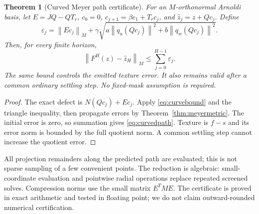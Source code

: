 \documentclass[journal]{IEEEtran}
\newtheorem{theorem}{Theorem}
\theoremstyle{definition}
\newcommand{\norm}[1]{\left\lVert#1\right\rVert}
\begin{document}
\begin{theorem}[Curved Meyer path certificate]\label{thm:curvedpath}
For an $M$-orthonormal Arnoldi basis, let $E=JQ-QT_r$,
$c_0=0$, $c_{j+1}=\beta e_1+T_r c_j$, and
$\widehat z_j=z+Qc_j$. Define
\[
 \varepsilon_j=\norm{Ec_j}_M+
 \gamma\sqrt{a\norm{q_u(Qc_j)}^2+b\norm{q_w(Qc_j)}^2}.
\]
Then, for every finite horizon,
\begin{equation}
 \norm{F^H(z)-\widehat z_H}_M
 \leq\sum_{j=0}^{H-1}\varepsilon_j. \label{eq:curvedpath}
\end{equation}
The same bound controls the emitted texture error. It also remains valid
after a common ordinary settling step. No fixed-mask assumption is required.
\end{theorem}
\begin{proof}
The exact defect is $N(Qc_j)+Ec_j$. Apply \eqref{eq:curvebound} and the
triangle inequality, then propagate errors by Theorem~\ref{thm:meyermetric}.
The initial error is zero, so summation gives \eqref{eq:curvedpath}.
Texture is $f-s$ and its error norm is bounded by the full quotient norm.
A common settling step cannot increase the quotient error.
\end{proof}

All projection remainders along the predicted path are evaluated; this is
not sparse sampling of a few convenient points. The reduction is algebraic:
small-coordinate evaluation and pointwise radial operations replace repeated
screened solves. Compression norms use the small matrix $E^TME$.
The certificate is proved in exact arithmetic and tested in floating point;
we do not claim outward-rounded numerical certification.
\end{document}
